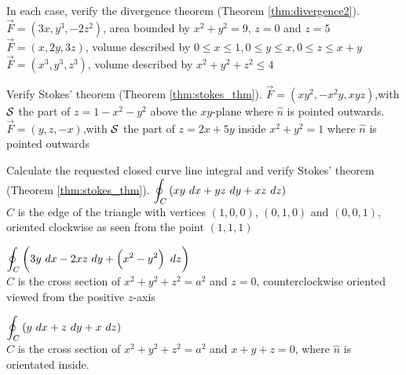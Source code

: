 \begin{Answer}

\end{Answer}

\begin{Exercise} In each case, verify the divergence theorem (Theorem \ref{thm:divergence2}).
	\Question $\vec F = \left(3x, y^3, -2z^2 \right)$, \quad area bounded by $x^2+y^2=9$, $z=0$ and $z=5$
	\Question $\vec F = \left(x, 2y, 3z \right)$, \quad volume described by $0\leq x \leq 1, 0 \leq y \leq x, 0 \leq z \leq x+y$
	\Question $\vec F = \left(x^3, y^3, z^3 \right)$, \quad volume described by $x^2+y^2+z^2 \leq 4$ 
\end{Exercise}

\begin{Answer}

\end{Answer}

\begin{Exercise} Verify Stokes' theorem (Theorem \ref{thm:stokes_thm}).
	\Question $\vec F = (xy^2, -x^2 y, xyz)$,\quad with $\mathcal{S}$ the part of $z=1-x^2-y^2$ above the $xy$-plane where $\hat n$ is pointed outwards.
	\Question $\vec F = (y, z, -x)$,\quad with $\mathcal{S}$ the part of $z=2x+5y$ inside $x^2+y^2=1$ where $\hat n$ is pointed outwards
\end{Exercise}

\begin{Answer}

\end{Answer}

\begin{Exercise} Calculate the requested closed curve line integral and verify Stokes' theorem (Theorem \ref{thm:stokes_thm}).
	\Question $\displaystyle \oint_C \left(xy \ dx +yz\ dy + xz \ dz \right)$ \\[0.2cm]
	$C$ is the edge of the triangle with vertices $(1,0,0)$, $(0,1,0)$ and $(0,0,1)$, oriented clockwise as seen from the point $(1,1,1)$  %
	
	\Question $\displaystyle \oint_C \left(3y \ dx - 2xz \ dy + \left(x^2-y^2 \right) \ dz \right)$ \\[0.2cm]
	$C$ is the cross section of $x^2+y^2+z^2=a^2$ and $z=0$, counterclockwise oriented viewed from the positive $z$-axis  %
	
	\Question $\displaystyle \oint_C \left(y \ dx + z \ dy + x \ dz \right)$ \\[0.2cm]
	$C$ is the cross section of $x^2+y^2+z^2=a^2$ and $x+y+z=0$,  where $\hat n$ is orientated inside.  %
\end{Exercise}

\begin{Answer}

\end{Answer}